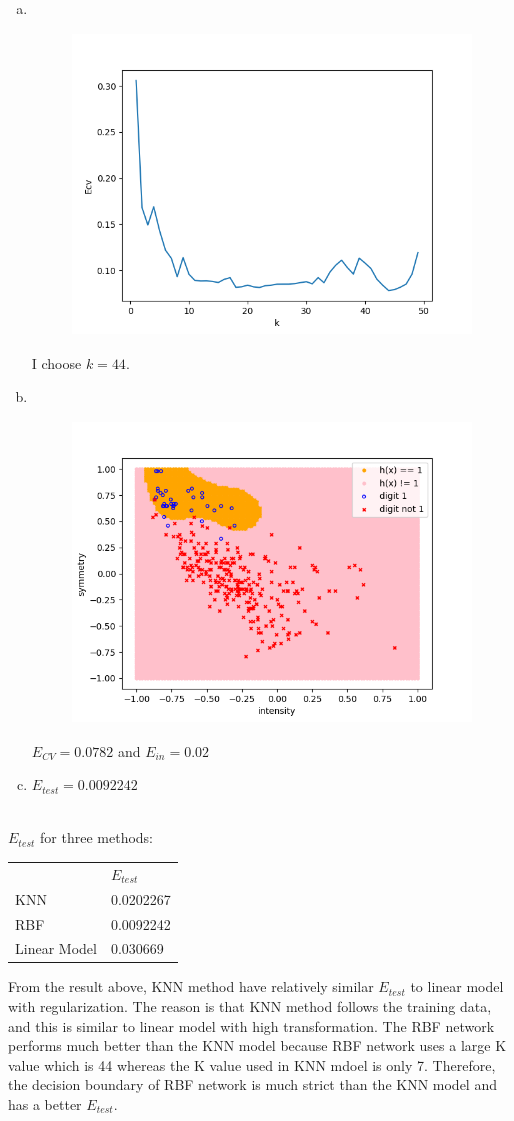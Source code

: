 \documentclass[11pt]{article}
\begin{document}
\newpage
{}
\begin{enumerate} [(a)]
	\item \ \begin{figure}[htb] 
			{\includegraphics[height=8cm]{p2a.png}}
	\end{figure}
	I choose $k = 44$.
	\item \ \begin{figure}[htb] 
			{\includegraphics[height=8cm]{p2b.png}}
	\end{figure}
	$E_{CV} = 0.0782$ and $E_{in} = 0.02$
	\item $E_{test} = 0.0092242$
\end{enumerate}
\newpage
{} \\
$E_{test}$ for three methods:

\begin{tabular}{ll}
             & $E_{test}$ \\
KNN          & 0.0202267  \\
RBF          & 0.0092242  \\
Linear Model & 0.030669  
\end{tabular}

From the result above, KNN method have relatively similar $E_{test}$ to linear model with regularization. The reason is that KNN method follows the training data, and this is similar to linear model with high transformation. The RBF network performs much better than the KNN model because RBF network uses a large K value which is 44 whereas the K value used in KNN mdoel is only 7. Therefore, the decision boundary of RBF network is much strict than the KNN model and has a better $E_{test}$.
\end{document}

